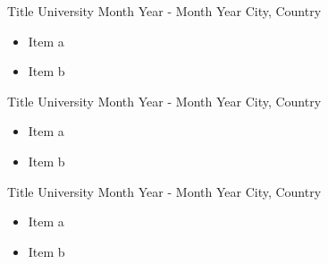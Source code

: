 

\cvevent
{Title}
{University}
{Month Year - Month Year}
{City, Country}
{
	\begin{itemize}
		\item Item a
		\item Item b
	\end{itemize}
}

\divider

\cvevent
{Title}
{University}
{Month Year - Month Year}
{City, Country}
{
	\begin{itemize}
		\item Item a
		\item Item b
	\end{itemize}
}

\divider

\cvevent
{Title}
{University}
{Month Year - Month Year}
{City, Country}
{
	\begin{itemize}
		\item Item a
		\item Item b
	\end{itemize}
}